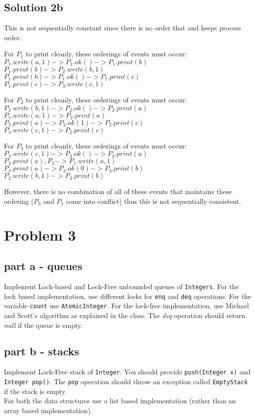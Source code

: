 \documentclass{article}
\begin{document}
\subsection{Solution 2b}
This is not sequentially constant since there is no order that and keeps process order.

For $P_1$ to print cleanly, these orderings of events must occur: \\
$P_1.write(a,1) -> P_1.ok() -> P_1.print(b)$ \\
$P_1.print(b) -> P_2.write(b, 1)$ \\
$P_1.print(b) -> P_1.ok() -> P_1.print(c)$ \\
$P_1.print(c) -> P_3.write(c, 1)$

For $P_2$ to print cleanly, these orderings of events must occur: \\
$ P_2.write(b,1) -> P_2.ok() -> P_2.print(a)$ \\
$ P_1.write(a,1) -> P_2.print(a)$ \\
$ P_2.print(a) -> P_2.ok(1) -> P_2.print(c)$ \\
$ P_3.write(c,1) -> P_2.print(c)$ 

For $P_3$ to print cleanly, these orderings of events must occur: \\
$P_3.write(c,1) -> P_3.ok() -> P_3.print(a)$ \\ 
$P_3.print(a), P_3 -> P_1.write(a,1)$ \\ 
$P_3.print(a) -> P_3.ok(0) -> P_3.print(b)$ \\ 
$P_2.write(b,1) -> P_3.print(b)$

However, there is no combination of all of these events that maintains these ordering ($P_3$ and $P_1$ come into conflict) thus this is not sequentially consistent.


\pagebreak
\section{Problem 3}
\subsection{part a - queues}
Implement Lock-based and Lock-Free unbounded queues of {\tt Integers}.
For the lock based implementation, use different locks for {\tt enq} and {\tt deq} operations.
For the variable {\tt count} use {\tt AtomicInteger}. 
For the lock-free implementation, 
use Michael and Scott's algorithm as
explained in the class. The {\em deq} operation should return {\em null}
if the queue is empty.\\

\subsection{part b - stacks}
Implement Lock-Free stack of {\tt Integer}. You should provide {\tt push(Integer x)}
and {\tt Integer pop()}. The {\tt pop} operation should throw an exception called
{\tt EmptyStack} if the stack is empty.
\\
For both the data structures use a list based implementation (rather than an array based implementation).
\end{document}
